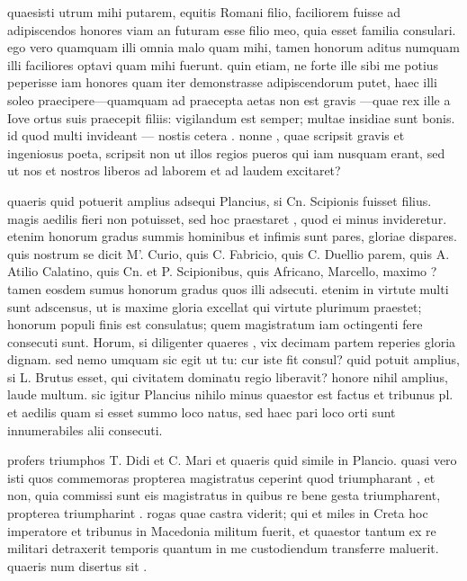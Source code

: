  quaesisti utrum mihi putarem, equitis Romani filio, faciliorem fuisse ad adipiscendos honores viam an futuram esse filio meo, quia esset familia consulari. ego vero quamquam illi omnia malo quam mihi, tamen honorum aditus numquam illi faciliores optavi quam mihi fuerunt. quin etiam, ne forte ille sibi me potius peperisse iam honores quam iter demonstrasse adipiscendorum putet, haec illi soleo praecipere—quamquam ad praecepta aetas non est gravis —quae rex ille a Iove ortus suis praecepit filiis: vigilandum est semper; multae insidiae sunt bonis. id quod multi invideant — nostis cetera . nonne , quae scripsit gravis et ingeniosus poeta, scripsit non ut illos regios pueros qui iam nusquam erant, sed ut nos et nostros liberos ad laborem et ad laudem excitaret?

 quaeris quid potuerit amplius adsequi Plancius, si Cn. Scipionis fuisset filius. magis aedilis fieri non potuisset, sed hoc praestaret , quod ei minus invideretur. etenim honorum gradus summis hominibus et infimis sunt pares, gloriae dispares. quis nostrum se dicit M'. Curio, quis C. Fabricio, quis C. Duellio parem, quis A. Atilio Calatino, quis Cn. et P. Scipionibus, quis Africano, Marcello, maximo ? tamen eosdem sumus honorum gradus quos illi adsecuti. etenim in virtute multi sunt adscensus, ut is maxime gloria excellat qui virtute plurimum praestet; honorum populi finis est consulatus; quem magistratum iam octingenti fere consecuti sunt. Horum, si diligenter quaeres , vix decimam partem reperies gloria dignam. sed nemo umquam sic egit ut tu: cur iste fit consul? quid potuit amplius, si L. Brutus esset, qui civitatem dominatu regio liberavit? honore nihil amplius, laude multum. sic igitur Plancius nihilo minus quaestor est factus et tribunus pl. et aedilis quam si esset summo loco natus, sed haec pari loco orti sunt innumerabiles alii consecuti.

 profers triumphos T. Didi et C. Mari et quaeris quid simile in Plancio. quasi vero isti quos commemoras propterea magistratus ceperint quod triumpharant , et non, quia commissi sunt eis magistratus in quibus re bene gesta triumpharent, propterea triumpharint . rogas quae castra viderit; qui et miles in Creta hoc imperatore et tribunus in Macedonia militum fuerit, et quaestor tantum ex re militari detraxerit temporis quantum in me custodiendum transferre maluerit. quaeris num disertus sit .

